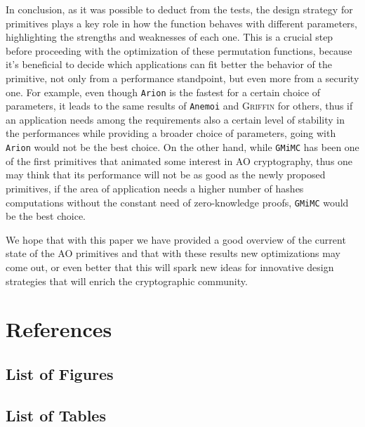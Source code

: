 \documentclass[12pt, a4paper]{report}
\begin{document}
In conclusion, as it was possible to deduct from the tests, the design strategy for primitives plays a key role in how the function behaves with different parameters, highlighting the strengths and weaknesses of each one.
This is a crucial step before proceeding with the optimization of these permutation functions, because it's beneficial to decide which applications can fit better the behavior of the primitive, not only from a performance standpoint, but even more from a security one.
For example, even though \texttt{Arion} is the fastest for a certain choice of parameters, it leads to the same results of \texttt{Anemoi} and \textsc{Griffin} for others, thus if an application needs among the requirements also a certain level of stability in the performances while providing a broader choice of parameters, going with \texttt{Arion} would not be the best choice.
On the other hand, while \texttt{GMiMC} has been one of the first primitives that animated some interest in AO cryptography, thus one may think that its performance will not be as good as the newly proposed primitives, if the area of application needs a higher number of hashes computations without the constant need of zero-knowledge proofs, \texttt{GMiMC} would be the best choice.

We hope that with this paper we have provided a good overview of the current state of the AO primitives and that with these results new optimizations may come out, or even better that this will spark new ideas for innovative design strategies that will enrich the cryptographic community.

\chapter{References}

\nocite{*}
\printbibliography[heading=subbibnumbered, title={Bibliography}]

\newpage
\section{List of Figures}\label{sec:listoffigures}
\listoffigures

\newpage
\section{List of Tables}\label{sec:listoftables}
\listoftables

\listofalgorithms
\end{document}
